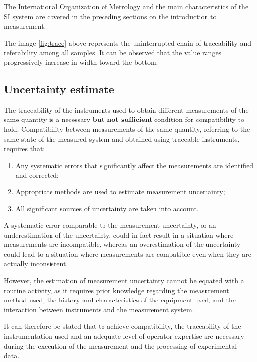 \documentclass[../main.tex]{subfiles}
\begin{document}
The International Organization of Metrology and the main characteristics of the SI system are covered in the preceding sections on the introduction to measurement.

The image \ref{fig:trace} above represents the uninterrupted chain of traceability and referability among all samples. It can be observed that the value ranges progressively increase in width toward the bottom.\\

\subsection{Uncertainty estimate} %

The traceability of the instruments used to obtain different measurements of the same quantity is a necessary \textbf{but not sufficient} condition for compatibility to hold. Compatibility between measurements of the same quantity, referring to the same state of the measured system and obtained using traceable instruments, requires that:

\begin{enumerate}
	\item[\textbf{-}] Any systematic errors that significantly affect the measurements are identified and corrected;
	\item[\textbf{-}] Appropriate methods are used to estimate measurement uncertainty;
	\item[\textbf{-}] All significant sources of uncertainty are taken into account.
	  
\end{enumerate}

A systematic error comparable to the measurement uncertainty, or an underestimation of the uncertainty, could in fact result in a situation where measurements are incompatible, whereas an overestimation of the uncertainty could lead to a situation where measurements are compatible even when they are actually inconsistent.

However, the estimation of measurement uncertainty cannot be equated with a routine activity, as it requires prior knowledge regarding the measurement method used, the history and characteristics of the equipment used, and the interaction between instruments and the measurement system. 

It can therefore be stated that to achieve compatibility, the traceability of the instrumentation used and an adequate level of operator expertise are necessary during the execution of the measurement and the processing of experimental data.
\end{document}
